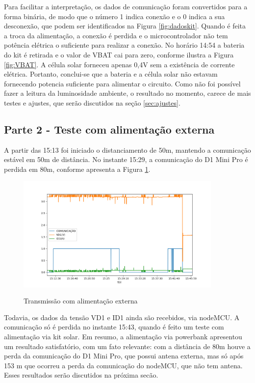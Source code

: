 \documentclass[11pt,a4paper]{article}
\begin{document}
Para facilitar a interpretação, os dados de comunicação foram convertidos para a forma binária, de modo que o número 1 indica conexão e o 0 indica a sua desconexão, que podem ser identificados na Figura \ref{fig:dadoskit}. Quando é feita a troca da alimentação, a conexão é perdida e o microcontrolador não tem potência elétrica o suficiente para realizar a conexão. No horário 14:54 a bateria do kit é retirada e o valor de VBAT cai para zero, conforme ilustra a Figura \ref{fig:VBAT}. A célula solar forneceu apenas 0,4V sem a existência de corrente elétrica. Portanto, conclui-se que a bateria e a célula solar não estavam fornecendo potencia suficiente para alimentar o circuito. Como não foi possível fazer a leitura da luminosidade ambiente, o resultado no momento, carece de mais testes e ajustes, que serão discutidos na seção \ref{sec:ajustes}. 


\subsection{Parte 2 - Teste com alimentação externa}

A partir das 15:13 foi iniciado o distanciamento de 50m, mantendo a comunicação estável em 50m de distância. No instante 15:29, a comunicação do D1 Mini Pro é perdida em 80m, conforme apresenta a Figura \ref{fig:50m}.

\begin{figure}[hbt]
	\centering
		\caption{Transmissão com alimentação externa}
		\includegraphics[width=0.9\textwidth]{powerbank50m.png} 
		\label{fig:50m} 
\end{figure} 

\newpage

Todavia, os dados da tensão VD1 e ID1 ainda são recebidos, via nodeMCU. A comunicação só é perdida no instante 15:43, quando é feito um teste com alimentação via kit solar. Em resumo, a alimentação via powerbank apresentou um resultado satisfatório, com um fato relevante: com a distância de 80m houve a perda da comunicação do D1 Mini Pro, que possui antena externa, mas só após 153 m que ocorreu a perda da comunicação do nodeMCU, que não tem antena. Esses resultados serão discutidos na próxima secão.
\end{document}
